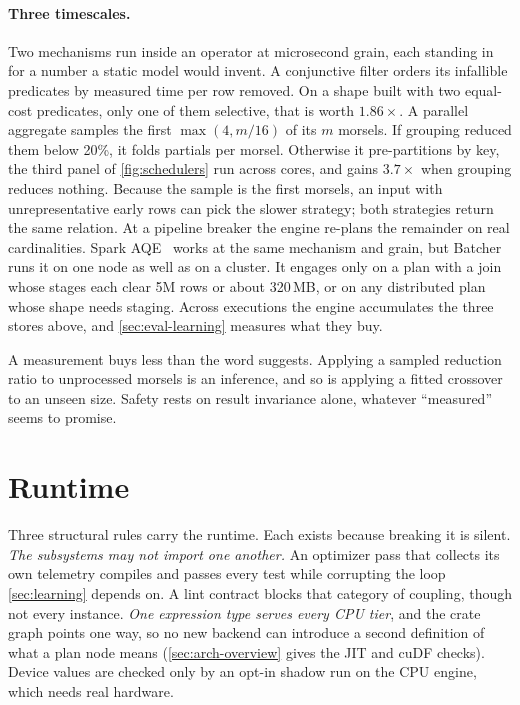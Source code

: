 \documentclass[10pt,twocolumn,letterpaper]{article}   %
\newcommand{\sys}{Batcher}
\begin{document}
\paragraph{Three timescales.} Two mechanisms run inside an operator at microsecond grain, each
standing in for a number a static model would invent. A conjunctive filter orders its
infallible predicates by measured time per row removed. On a shape built with two equal-cost
predicates, only one of them selective, that is worth $1.86\times$. A parallel aggregate
samples the first $\max(4, m/16)$ of its $m$ morsels. If grouping reduced them below 20\%, it
folds partials per morsel. Otherwise it pre-partitions by key, the third panel of
\cref{fig:schedulers} run across cores, and gains $3.7\times$ when grouping reduces nothing.
Because the sample is the first morsels, an input with unrepresentative early rows can pick the
slower strategy; both strategies return the same relation. At a pipeline breaker the engine
re-plans the remainder on real cardinalities. Spark AQE~\cite{sparkaqe} works at the same
mechanism and grain, but \sys{} runs it on one node as well as on a cluster. It engages only
on a plan with a join whose stages each clear 5M rows or about 320\,MB, or on any distributed
plan whose shape needs staging. Across executions the engine accumulates the three stores
above, and \cref{sec:eval-learning} measures what they buy.

A measurement buys less than the word suggests. Applying a sampled reduction ratio to
unprocessed morsels is an inference, and so is applying a fitted crossover to an unseen size.
Safety rests on result invariance alone, whatever ``measured'' seems to promise.
\section{Runtime}
\label{sec:arch}

Three structural rules carry the runtime. Each exists because breaking it is silent.
\emph{The subsystems may not import one another.} An optimizer pass that collects its own
telemetry compiles and passes every test while corrupting the loop \cref{sec:learning}
depends on. A lint contract blocks that category of coupling, though not every instance.
\emph{One expression type serves every CPU tier}, and the crate graph points one way, so no
new backend can introduce a second definition of what a plan node means
(\cref{sec:arch-overview} gives the JIT and cuDF checks). Device values are checked only by an
opt-in shadow run on the CPU engine, which needs real hardware.
\end{document}
